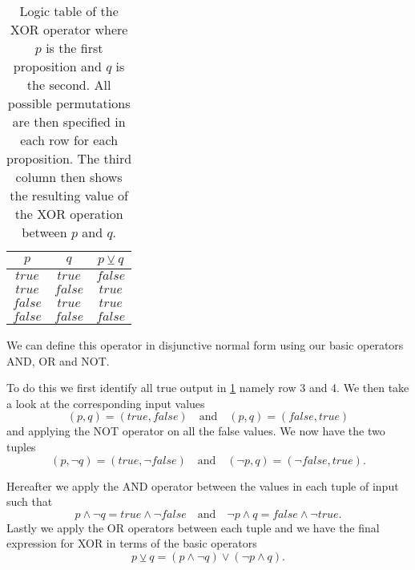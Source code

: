                 \begin{table}[h!]
                    \centering
                    \begin{tabular}{|c|c|c|}
                    	\hline
                    	  $p$   &   $q$   & $p \veebar q$ \\ \hline
                    	$true$  & $true$  &    $false$    \\ \hline
                    	$true$  & $false$ &    $true$     \\ \hline
                    	$false$ & $true$  &    $true$     \\ \hline
                    	$false$ & $false$ &    $false$    \\ \hline
                    \end{tabular}
                    \caption{Logic table of the XOR operator where $p$ is the first proposition and $q$ is the second. All possible permutations are then specified in each row for each proposition. The third column then shows the resulting value of the XOR operation between $p$ and $q$.}
                    \label{LogicTable:XOR}
                \end{table}
            
                We can define this operator in disjunctive normal  form using our basic operators AND, OR and NOT. 
                
                To do this we first identify all true output in \ref{LogicTable:XOR} namely row 3 and 4. We then take a look at the corresponding input values
                \begin{equation}
                    (p,q) = (true, false) \quad \text{and} \quad (p,q) = (false, true)
                \end{equation}
                and applying the NOT operator on all the false values. We now have the two tuples
                \begin{equation}
                    (p,\neg q) = (true, \neg false) \quad \text{and} \quad (\neg p, q) = (\neg false, true).
                \end{equation}
                
                Hereafter we apply the AND operator between the values in each tuple of input such that
                \begin{equation}
                    p \wedge \neg q = true \wedge \neg false \quad \text{and} \quad \neg p \wedge q = false \wedge \neg true.
                \end{equation}
                Lastly we apply the OR operators between each tuple and we have the final expression for XOR in terms of the basic operators
                \begin{equation}
                    p \veebar q = (p \wedge \neg q) \vee (\neg p \wedge q).
                \end{equation}
                
